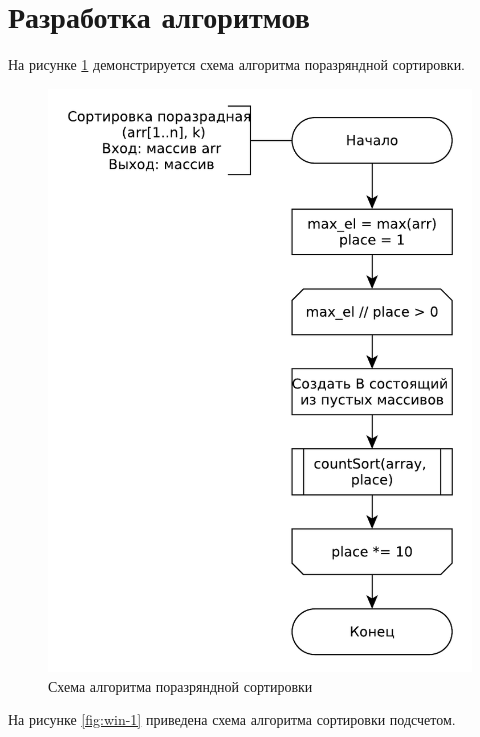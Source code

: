 \section{Разработка алгоритмов}

На рисунке \ref{fig:win-2} демонстрируется схема алгоритма поразряндной сортировки.

\begin{figure}[ht!]
	\centering
	\includegraphics[width=0.9\linewidth]{assets/range.pdf}
	\caption{Схема алгоритма поразряндной сортировки}
	\label{fig:win-2}
\end{figure}

На рисунке \ref{fig:win-1} приведена схема алгоритма сортировки подсчетом.  

